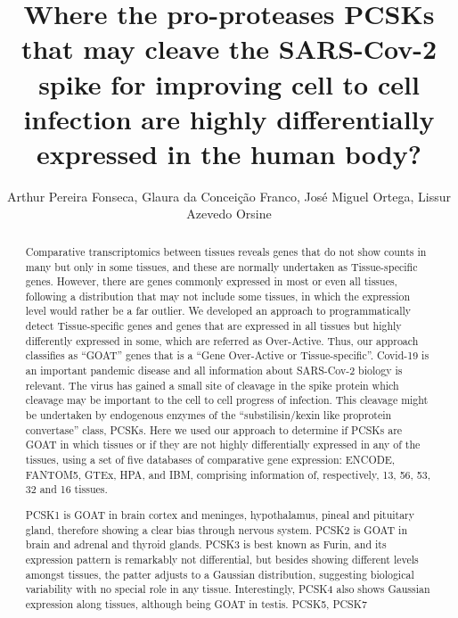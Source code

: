 \documentclass[twoside]{article}
\title{\vspace{-15mm}\fontsize{24pt}{10pt}\selectfont\textbf{ Where the pro-proteases PCSKs that may cleave the SARS-Cov-2 spike for improving cell to cell infection are highly differentially expressed in the human body? }} %
\author{ Arthur Pereira Fonseca,  Glaura da Concei\c{c}\~ao Franco,  Jos\'e Miguel Ortega,  Lissur Azevedo Orsine }
\affil{ UNIVERSIDADE FEDERAL DE MINAS GERAIS,  UNIVERSIDADE FEDERAL DE MINAS GERAIS }
\date{}
\begin{document}
  
  
  \maketitle %
  
  
  \thispagestyle{fancy} %
  
  
  \begin{abstract}
  Comparative transcriptomics between tissues reveals genes that do not show counts in many but only in some tissues,  and these are normally undertaken as Tissue-specific genes. However,  there are genes commonly expressed in most or even all tissues,  following a distribution that may not include some tissues,  in which the expression level would rather be a far outlier. We developed an approach to programmatically detect Tissue-specific genes and genes that are expressed in all tissues but highly differently expressed in some,  which are referred as Over-Active. Thus,  our approach classifies as “GOAT” genes that is a “Gene Over-Active or Tissue-specific”. Covid-19 is an important pandemic disease and all information about SARS-Cov-2 biology is relevant. The virus has gained a small site of cleavage in the spike protein which cleavage may be important to the cell to cell progress of infection. This cleavage might be undertaken by endogenous enzymes of the “substilisin/kexin like proprotein convertase” class,  PCSKs. Here we used our approach to determine if PCSKs are GOAT in which tissues or if they are not highly differentially expressed in any of the tissues,  using a set of five databases of comparative gene expression: ENCODE,  FANTOM5,  GTEx,  HPA,  and IBM,  comprising information of,  respectively,  13,  56,  53,  32 and 16 tissues.

PCSK1 is GOAT in brain cortex and meninges,  hypothalamus,  pineal and pituitary gland,  therefore showing a clear bias through nervous system. PCSK2 is GOAT in brain and adrenal and thyroid glands. PCSK3 is best known as Furin,  and its expression pattern is remarkably not differential,  but besides showing different levels amongst tissues,  the patter adjusts to a Gaussian distribution,  suggesting biological variability with no special role in any tissue. Interestingly,  PCSK4 also shows Gaussian expression along tissues,  although being GOAT in testis. PCSK5,  PCSK7


\end{abstract}
\end{document}
